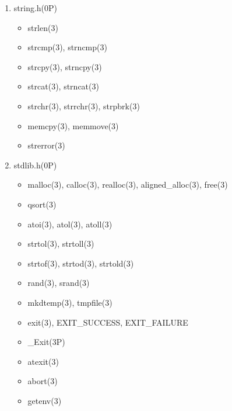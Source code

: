 \documentclass{article}
\begin{document}
\begin{enumerate}
\begin{enumerate}
            \item string.h(0P)
                \begin{itemize}
                    \item strlen(3)
                    \item strcmp(3), strncmp(3)
                    \item strcpy(3), strncpy(3)
                    \item strcat(3), strncat(3)
                    \item strchr(3), strrchr(3), strpbrk(3)
                    \item memcpy(3), memmove(3)

                    \item strerror(3)
                \end{itemize}
            \item stdlib.h(0P)
                \begin{itemize}
                    \item malloc(3), calloc(3), realloc(3), aligned_alloc(3), free(3)

                    \item qsort(3)

                    \item atoi(3), atol(3), atoll(3)
                    \item strtol(3), strtoll(3)
                    \item strtof(3), strtod(3), strtold(3)

                    \item rand(3), srand(3)
                    \item mkdtemp(3), tmpfile(3)

                    \item exit(3), EXIT_SUCCESS, EXIT_FAILURE
                    \item _Exit(3P)
                    \item atexit(3)
                    \item abort(3)

                    \item getenv(3)


\end{itemize}
\end{enumerate}
\end{enumerate}
\end{document}
